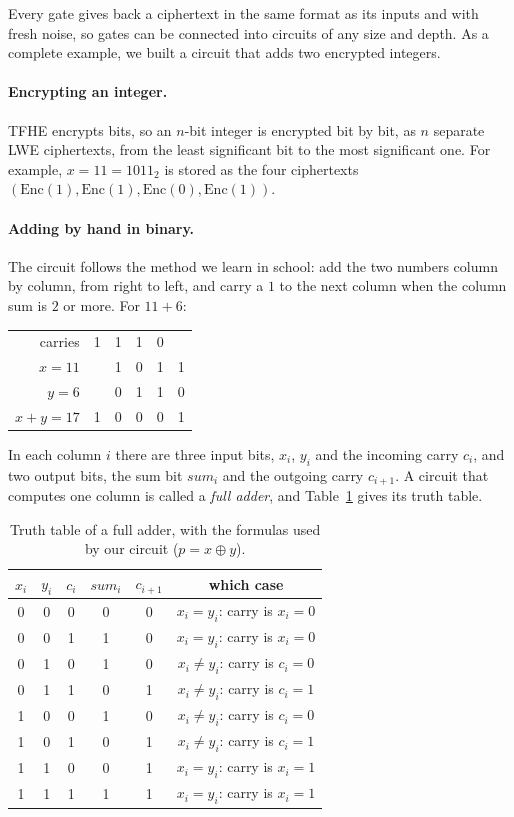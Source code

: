 \documentclass[12pt]{article}
\theoremstyle{plain}
\theoremstyle{definition}
\begin{document}
Every gate gives back a ciphertext in the same format as its inputs and with
fresh noise, so gates can be connected into circuits of any size and depth. As
a complete example, we built a circuit that adds two encrypted integers.

\paragraph{Encrypting an integer.}
TFHE encrypts bits, so an $n$-bit integer is encrypted bit by bit, as $n$
separate LWE ciphertexts, from the least significant bit to the most
significant one. For example, $x=11=1011_2$ is stored as the four ciphertexts
$(\mathrm{Enc}(1),\mathrm{Enc}(1),\mathrm{Enc}(0),\mathrm{Enc}(1))$.

\paragraph{Adding by hand in binary.}
The circuit follows the method we learn in school: add the two numbers column
by column, from right to left, and carry a $1$ to the next column when the
column sum is $2$ or more. For $11+6$:
\begin{center}
\small
\begin{tabular}{@{}r@{\qquad}ccccc@{}}
carries & 1 & 1 & 1 & 0 & \\
$x=11$ &   & 1 & 0 & 1 & 1\\
$y=6$  &   & 0 & 1 & 1 & 0\\
\midrule
$x+y=17$ & 1 & 0 & 0 & 0 & 1\\
\end{tabular}
\end{center}
In each column $i$ there are three input bits, $x_i$, $y_i$ and the incoming
carry $c_i$, and two output bits, the sum bit $\mathit{sum}_i$ and the outgoing
carry $c_{i+1}$. A circuit that computes one column is called a \emph{full
adder}, and Table~\ref{tab:fulladder} gives its truth table.

\begin{table}[!htb]
\centering
\caption{Truth table of a full adder, with the formulas used by our circuit
($p=x\oplus y$).}
\label{tab:fulladder}
\small
\begin{tabular}{@{}ccc@{\qquad}cc@{\qquad}c@{}}
\toprule
$x_i$ & $y_i$ & $c_i$ & $\mathit{sum}_i$ & $c_{i+1}$ & which case\\
\midrule
0 & 0 & 0 & 0 & 0 & $x_i=y_i$: carry is $x_i=0$\\
0 & 0 & 1 & 1 & 0 & $x_i=y_i$: carry is $x_i=0$\\
0 & 1 & 0 & 1 & 0 & $x_i\ne y_i$: carry is $c_i=0$\\
0 & 1 & 1 & 0 & 1 & $x_i\ne y_i$: carry is $c_i=1$\\
1 & 0 & 0 & 1 & 0 & $x_i\ne y_i$: carry is $c_i=0$\\
1 & 0 & 1 & 0 & 1 & $x_i\ne y_i$: carry is $c_i=1$\\
1 & 1 & 0 & 0 & 1 & $x_i=y_i$: carry is $x_i=1$\\
1 & 1 & 1 & 1 & 1 & $x_i=y_i$: carry is $x_i=1$\\
\bottomrule
\end{tabular}
\end{table}
\end{document}
